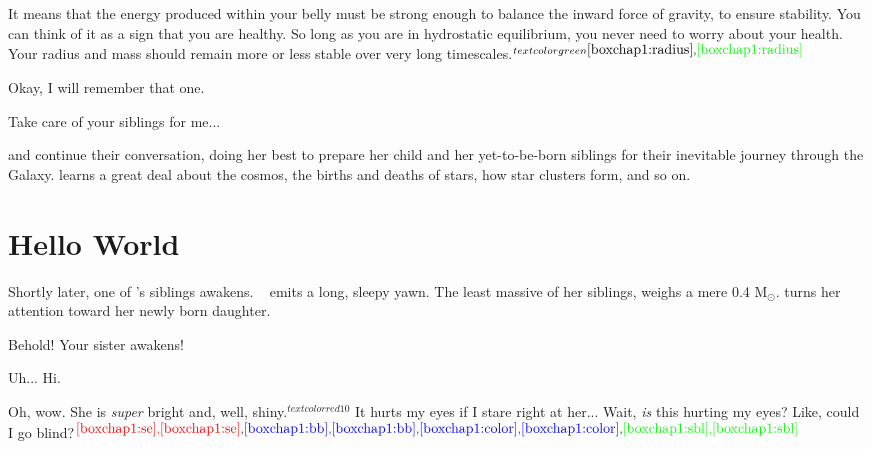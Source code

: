 \documentclass[main.tex]{subfiles}
\begin{document}
\par \Pleione It means that the energy produced within your belly must be strong enough to balance the inward force of gravity, to ensure stability.  You can think of it as a sign that you are healthy.  So long as you are in hydrostatic equilibrium, you never need to worry about your health.  Your radius and mass should remain more or less stable over very long timescales.$^{textcolor{green}{{\ref{boxchap1:radius}},\textcolor{green}{\ref{boxchap1:radius}}}}$ 

\par \Maia Okay, I will remember that one.

\par \Pleione Take care of your siblings for me...

\par \nar \rmmaia and \rmpleione continue their conversation, \rmpleione doing her best to prepare her child and her yet-to-be-born siblings for their inevitable journey through the Galaxy.  \rmmaia learns a great deal about the cosmos, the births and deaths of stars, how star clusters form, and so on.

\section{Hello World} \label{hello}

\par \nar Shortly later, one of \rmmaia's siblings awakens.  \rmelectra~ emits a long, sleepy yawn.  The least massive of her siblings, \rmelectra weighs a mere 0.4 M$_{\odot}$.  \rmpleione turns her attention toward her newly born daughter.

\par \Pleione Behold!  Your sister awakens!

\par \Electra  Uh... Hi.

\par \Maia Oh, wow.  She is \textit{super} bright and, well, shiny.$^{textcolor{red}{10}}$  It hurts my eyes if I stare right at her... Wait, \textit{is} this hurting my eyes?  Like, could I go blind?$^{\textcolor{red}{{\ref{boxchap1:se}},\textcolor{red}{\ref{boxchap1:se}}},\textcolor{blue}{{\ref{boxchap1:bb}},\textcolor{blue}{\ref{boxchap1:bb}}},\textcolor{blue}{{\ref{boxchap1:color}},\textcolor{blue}{\ref{boxchap1:color}}},\textcolor{green}{{\ref{boxchap1:sbl}},\textcolor{green}{\ref{boxchap1:sbl}}}}$
\end{document}
